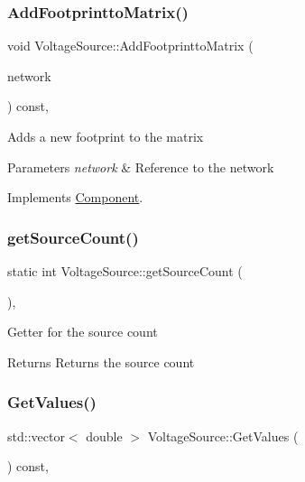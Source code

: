 \subsubsection{\texorpdfstring{Add\+Footprintto\+Matrix()}{AddFootprinttoMatrix()}}
{\footnotesize\ttfamily void Voltage\+Source\+::\+Add\+Footprintto\+Matrix (\begin{DoxyParamCaption}\item[{\hyperlink{classNetwork}{Network} \&}]{network }\end{DoxyParamCaption}) const\hspace{0.3cm}{\ttfamily [override]}, {\ttfamily [virtual]}}

Adds a new footprint to the matrix 
\begin{DoxyParams}{Parameters}
{\em network} & Reference to the network \\
\hline
\end{DoxyParams}


Implements \hyperlink{classComponent_a833d40a0f50c3c06dcab2e035b758e6f}{Component}.

\mbox{\label{classVoltageSource_a0b37bef66decef2d9d0268a1f732a78e}} 
\subsubsection{\texorpdfstring{get\+Source\+Count()}{getSourceCount()}}
{\footnotesize\ttfamily static int Voltage\+Source\+::get\+Source\+Count (\begin{DoxyParamCaption}{ }\end{DoxyParamCaption})\hspace{0.3cm}{\ttfamily [inline]}, {\ttfamily [static]}}

Getter for the source count \begin{DoxyReturn}{Returns}
Returns the source count 
\end{DoxyReturn}
\mbox{\label{classVoltageSource_a60bb1c5c07f668854a817d626f220f84}} 
\subsubsection{\texorpdfstring{Get\+Values()}{GetValues()}}
{\footnotesize\ttfamily std\+::vector$<$ double $>$ Voltage\+Source\+::\+Get\+Values (\begin{DoxyParamCaption}{ }\end{DoxyParamCaption}) const\hspace{0.3cm}{\ttfamily [override]}, {\ttfamily [virtual]}}

